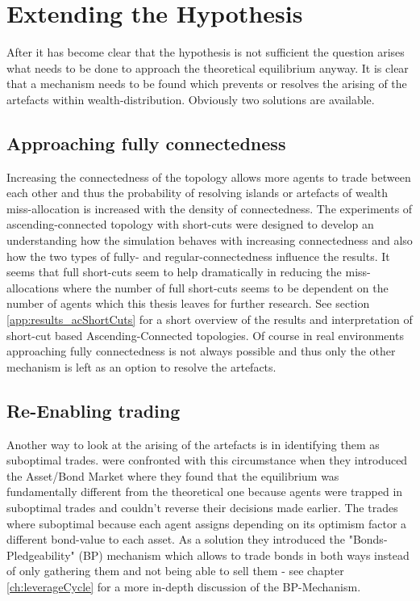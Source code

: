 \documentclass[Bachelorarbeit.tex]{subfiles}
\begin{document}
\section{Extending the Hypothesis}
After it has become clear that the hypothesis is not sufficient the question arises what needs to be done to approach the theoretical equilibrium anyway. It is clear that a mechanism needs to be found which prevents or resolves the arising of the artefacts within wealth-distribution. Obviously two solutions are available.

\subsection{Approaching fully connectedness}
Increasing the connectedness of the topology allows more agents to trade between each other and thus the probability of resolving islands or artefacts of wealth miss-allocation is increased with the density of connectedness. The experiments of ascending-connected topology with short-cuts were designed to develop an understanding how the simulation behaves with increasing connectedness and also how the two types of  fully- and regular-connectedness influence the results. It seems that full short-cuts seem to help dramatically in reducing the miss-allocations where the number of full short-cuts seems to be dependent on the number of agents which this thesis leaves for further research. See section \ref{app:results_acShortCuts} for a short overview of the results and interpretation of short-cut based Ascending-Connected topologies.
\linebreak
Of course in real environments approaching fully connectedness is not always possible and thus only the other mechanism is left as an option to resolve the artefacts.

\subsection{Re-Enabling trading}
\label{ch:interpretation_reenablingTrading}
Another way to look at the arising of the artefacts is in identifying them as suboptimal trades. \cite{Breuer2015} were confronted with this circumstance when they introduced the Asset/Bond Market where they found that the equilibrium was fundamentally different from the theoretical one because agents were trapped in suboptimal trades and couldn't reverse their decisions made earlier. The trades where suboptimal because each agent assigns depending on its optimism factor a different bond-value to each asset. As a solution they introduced the "Bonds-Pledgeability" (BP) mechanism which allows to trade bonds in both ways instead of only gathering them and not being able to sell them - see chapter \ref{ch:leverageCycle} for a more in-depth discussion of the BP-Mechanism.
\end{document}
